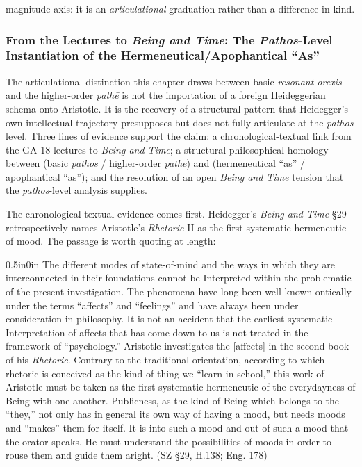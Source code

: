 magnitude-axis: it is an \textit{articulational} graduation rather than a difference in kind.

\subsubsection{From the Lectures to \textit{Being and Time}: The \textit{Pathos}-Level Instantiation of the Hermeneutical/Apophantical ``As''}

The articulational distinction this chapter draws between basic \textit{resonant orexis} and the higher-order \textit{pathē} is not the importation of a foreign Heideggerian schema onto Aristotle. It is the recovery of a structural pattern that Heidegger's own intellectual trajectory presupposes but does not fully articulate at the \textit{pathos} level. Three lines of evidence support the claim: a chronological-textual link from the GA 18 lectures to \textit{Being and Time}; a structural-philosophical homology between (basic \textit{pathos} / higher-order \textit{pathē}) and (hermeneutical ``as'' / apophantical ``as''); and the resolution of an open \textit{Being and Time} tension that the \textit{pathos}-level analysis supplies.

The chronological-textual evidence comes first. Heidegger's \textit{Being and Time} \S29 retrospectively names Aristotle's \textit{Rhetoric} II as the first systematic hermeneutic of mood. The passage is worth quoting at length:

\begin{adjustwidth}{0.5in}{0in}
The different modes of state-of-mind and the ways in which they are interconnected in their foundations cannot be Interpreted within the problematic of the present investigation. The phenomena have long been well-known ontically under the terms ``affects'' and ``feelings'' and have always been under consideration in philosophy. It is not an accident that the earliest systematic Interpretation of affects that has come down to us is not treated in the framework of ``psychology.'' Aristotle investigates the  [affects] in the second book of his \textit{Rhetoric}. Contrary to the traditional orientation, according to which rhetoric is conceived as the kind of thing we ``learn in school,'' this work of Aristotle must be taken as the first systematic hermeneutic of the everydayness of Being-with-one-another. Publicness, as the kind of Being which belongs to the ``they,'' not only has in general its own way of having a mood, but needs moods and ``makes'' them for itself. It is into such a mood and out of such a mood that the orator speaks. He must understand the possibilities of moods in order to rouse them and guide them aright. (SZ \S29, H.138; Eng. 178)
\end{adjustwidth}

